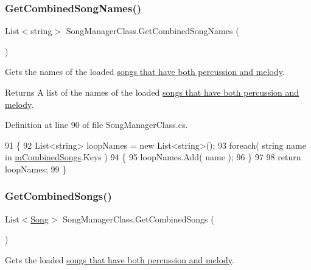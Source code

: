 \subsubsection{\texorpdfstring{Get\+Combined\+Song\+Names()}{GetCombinedSongNames()}}
{\footnotesize\ttfamily List$<$string$>$ Song\+Manager\+Class.\+Get\+Combined\+Song\+Names (\begin{DoxyParamCaption}{ }\end{DoxyParamCaption})}



Gets the names of the loaded \hyperlink{group___song_group_DocSongCombined}{songs that have both percussion and melody}. 

\begin{DoxyReturn}{Returns}
A list of the names of the loaded \hyperlink{group___song_group_DocSongCombined}{songs that have both percussion and melody}. 
\end{DoxyReturn}


Definition at line 90 of file Song\+Manager\+Class.\+cs.


\begin{DoxyCode}
91     \{
92         List<string> loopNames = \textcolor{keyword}{new} List<string>();
93         \textcolor{keywordflow}{foreach}( \textcolor{keywordtype}{string} name \textcolor{keywordflow}{in} \hyperlink{group___s_m_priv_var_gaf6b4ff41b8da95d10ad3db62df111faa}{mCombinedSongs}.Keys )
94         \{
95             loopNames.Add( name );
96         \}
97 
98         \textcolor{keywordflow}{return} loopNames;
99     \}
\end{DoxyCode}
\mbox{\label{group___s_m_pub_func_ga413595693011bd6021dfd6eb941bf0e6}} 
\subsubsection{\texorpdfstring{Get\+Combined\+Songs()}{GetCombinedSongs()}}
{\footnotesize\ttfamily List$<$\hyperlink{class_song}{Song}$>$ Song\+Manager\+Class.\+Get\+Combined\+Songs (\begin{DoxyParamCaption}{ }\end{DoxyParamCaption})}



Gets the loaded \hyperlink{group___song_group_DocSongCombined}{songs that have both percussion and melody}. 

